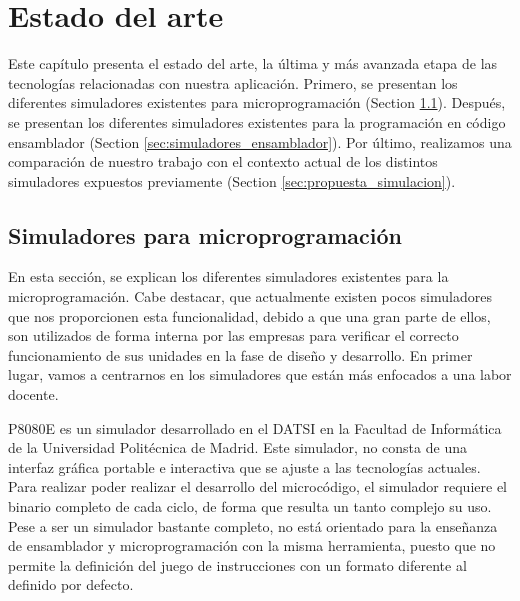 \chead[]{}
\renewcommand{\headrulewidth}{0.5pt}

\lfoot[]{}
\cfoot[]{}
\rfoot[]{}
\renewcommand{\footrulewidth}{0pt}

\chapter{Estado del arte}
\label{ch:state_of_the_art}

Este capítulo presenta el estado del arte, la última y más avanzada etapa de las tecnologías relacionadas con nuestra aplicación. Primero, se presentan los diferentes simuladores existentes para microprogramación (Section \ref{sec:simuladores_microprogramacion}). Después, se presentan los diferentes simuladores existentes para la programación en código ensamblador (Section \ref{sec:simuladores_ensamblador}). Por último, realizamos una comparación de nuestro trabajo con el contexto actual de los distintos simuladores expuestos previamente (Section \ref{sec:propuesta_simulacion}).

\section{Simuladores para microprogramación}
\label{sec:simuladores_microprogramacion}

En esta sección, se explican los diferentes simuladores existentes para la microprogramación. Cabe destacar, que actualmente existen pocos simuladores que nos proporcionen esta funcionalidad, debido a que una gran parte de ellos, son utilizados de forma interna por las empresas para verificar el correcto funcionamiento de sus unidades en la fase de diseño y desarrollo. En primer lugar, vamos a centrarnos en los simuladores que están más enfocados a una labor docente.

P8080E \cite{p8080E} es un simulador desarrollado en el DATSI en la Facultad de Informática de la Universidad Politécnica de Madrid. Este simulador, no consta de una interfaz gráfica portable e interactiva que se ajuste a las tecnologías actuales. Para realizar poder realizar el desarrollo del microcódigo, el simulador requiere el binario completo de cada ciclo, de forma que resulta un tanto complejo su uso. Pese a ser un simulador bastante completo, no está orientado para la enseñanza de ensamblador y microprogramación con la misma herramienta, puesto que no permite la definición del juego de instrucciones con un formato diferente al definido por defecto.

